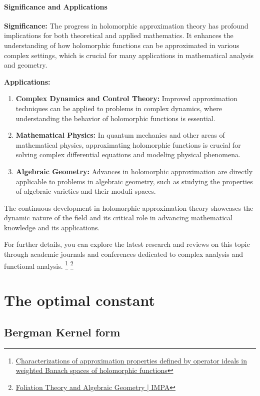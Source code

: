 \documentclass[lang=en,12pt]{beautybook}
\begin{document}
\subsubsection*{Significance and Applications}

\textbf{Significance:}
The progress in holomorphic approximation theory has profound implications for both theoretical and applied mathematics. It enhances the understanding of how holomorphic functions can be approximated in various complex settings, which is crucial for many applications in mathematical analysis and geometry.

\textbf{Applications:}
\begin{enumerate}
    \item \textbf{Complex Dynamics and Control Theory:} Improved approximation techniques can be applied to problems in complex dynamics, where understanding the behavior of holomorphic functions is essential.
    \item \textbf{Mathematical Physics:} In quantum mechanics and other areas of mathematical physics, approximating holomorphic functions is crucial for solving complex differential equations and modeling physical phenomena.
    \item \textbf{Algebraic Geometry:} Advances in holomorphic approximation are directly applicable to problems in algebraic geometry, such as studying the properties of algebraic varieties and their moduli spaces.
\end{enumerate}

The continuous development in holomorphic approximation theory showcases the dynamic nature of the field and its critical role in advancing mathematical knowledge and its applications.

For further details, you can explore the latest research and reviews on this topic through academic journals and conferences dedicated to complex analysis and functional analysis.
\footnote{\href{https://link.springer.com/article/10.1007/s43036-022-00205-1}{Characterizations of approximation properties defined by operator ideals in weighted Banach spaces of holomorphic functions}}
\footnote{\href{https://impa.br/eventos-do-impa/2024-2/foliation-theory-and-algebraic-geometry/}{Foliation Theory and Algebraic Geometry | IMPA}}

\chapter{The optimal constant}
\section{Bergman Kernel form}
\end{document}
